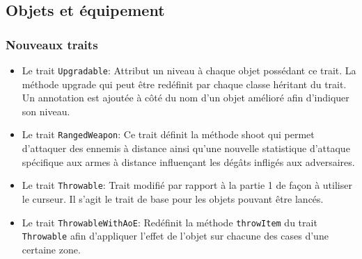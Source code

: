 \documentclass[10pt,a4paper]{article}
\begin{document}
\subsection{Objets et équipement}
\subsubsection{Nouveaux traits}
\begin{itemize}
    \item Le trait \texttt{Upgradable}: Attribut un niveau à chaque objet possédant ce trait. La méthode upgrade qui peut être redéfinit par chaque classe héritant du trait. Un annotation est ajoutée à côté du nom d'un objet amélioré afin d'indiquer son niveau.
    \item Le trait \texttt{RangedWeapon}: Ce trait définit la méthode shoot qui permet d'attaquer des ennemis à distance ainsi qu'une nouvelle statistique d'attaque spécifique aux armes à distance influençant les dégâts infligés aux adversaires.
    \item Le trait \texttt{Throwable}: Trait modifié par rapport à la partie 1 de façon à utiliser le curseur. Il s'agit le trait de base pour les objets pouvant être lancés.
    \item Le trait \texttt{ThrowableWithAoE}: Redéfinit la méthode \texttt{throwItem} du trait \texttt{Throwable} afin d'appliquer l'effet de l'objet sur chacune des cases d'une certaine zone.
\end{itemize}
\end{document}
